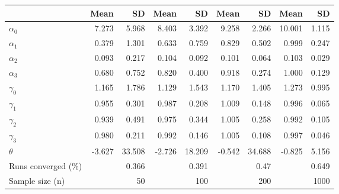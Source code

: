
\begin{tabular}[t]{lrrrrrrrr}
\toprule
  & Mean & SD & Mean  & SD  & Mean   & SD   & Mean    & SD   \\
\midrule
$\alpha_{0}$ & 7.273 & 5.968 & 8.403 & 3.392 & 9.258 & 2.266 & 10.001 & 1.115\\
$\alpha_{1}$ & 0.379 & 1.301 & 0.633 & 0.759 & 0.829 & 0.502 & 0.999 & 0.247\\
$\alpha_{2}$ & 0.093 & 0.217 & 0.104 & 0.092 & 0.101 & 0.064 & 0.103 & 0.029\\
$\alpha_{3}$ & 0.680 & 0.752 & 0.820 & 0.400 & 0.918 & 0.274 & 1.000 & 0.129\\
$\gamma_{0}$ & 1.165 & 1.786 & 1.129 & 1.543 & 1.170 & 1.405 & 1.273 & 0.995\\
$\gamma_{1}$ & 0.955 & 0.301 & 0.987 & 0.208 & 1.009 & 0.148 & 0.996 & 0.065\\
$\gamma_{2}$ & 0.939 & 0.491 & 0.975 & 0.344 & 1.005 & 0.258 & 0.992 & 0.105\\
$\gamma_{3}$ & 0.980 & 0.211 & 0.992 & 0.146 & 1.005 & 0.108 & 0.997 & 0.046\\
$\theta$ & -3.627 & 33.508 & -2.726 & 18.209 & -0.542 & 34.688 & -0.825 & 5.156\\
Runs converged (\%) &  & 0.366 &  & 0.391 &  & 0.47 &  & 0.649\\
Sample size (n) &  & 50 &  & 100 &  & 200 &  & 1000\\
\bottomrule
\end{tabular}
